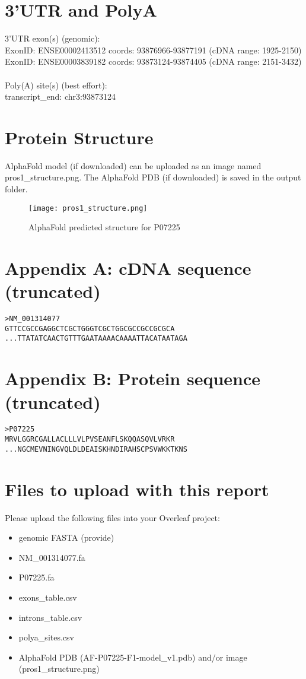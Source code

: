 \documentclass[12pt,a4paper]{article}
\begin{document}
\section*{3'UTR and PolyA}
3'UTR exon(s) (genomic): \\
ExonID: ENSE00002413512  coords: 93876966-93877191  (cDNA range: 1925-2150)\\
ExonID: ENSE00003839182  coords: 93873124-93874405  (cDNA range: 2151-3432)\\\\
Poly(A) site(s) (best effort):\\
transcript_end: chr3:93873124\\

\section*{Protein Structure}
AlphaFold model (if downloaded) can be uploaded as an image named pros1_structure.png. The AlphaFold PDB (if downloaded) is saved in the output folder.

\begin{figure}[H]
\centering
\texttt{[image: pros1\_structure.png]}
\caption{AlphaFold predicted structure for P07225}
\end{figure}

\clearpage
\appendix
\section*{Appendix A: cDNA sequence (truncated)}
\begin{verbatim}
>NM_001314077
GTTCCGCCGAGGCTCGCTGGGTCGCTGGCGCCGCCGCGCA ...TTATATCAACTGTTTGAATAAAACAAAATTACATAATAGA
\end{verbatim}

\section*{Appendix B: Protein sequence (truncated)}
\begin{verbatim}
>P07225
MRVLGGRCGALLACLLLVLPVSEANFLSKQQASQVLVRKR ...NGCMEVNINGVQLDLDEAISKHNDIRAHSCPSVWKKTKNS
\end{verbatim}

\section*{Files to upload with this report}
Please upload the following files into your Overleaf project:
\begin{itemize}
  \item genomic FASTA (provide)
  \item NM_001314077.fa
  \item P07225.fa
  \item exons_table.csv
  \item introns_table.csv
  \item polya_sites.csv
  \item AlphaFold PDB (AF-P07225-F1-model_v1.pdb) and/or image (pros1_structure.png)
\end{itemize}
\end{document}
